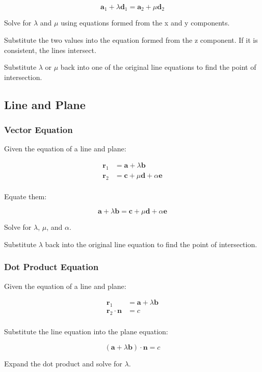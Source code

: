 \documentclass[a4paper,11pt]{report}
\newcommand{\bb}{\boldsymbol}
\begin{document}
$$
\bb{a}_1 + \lambda \bb{d}_1 = \bb{a}_2 + \mu \bb{d}_2
$$

Solve for $\lambda$ and $\mu$ using equations formed from the x and y
components.

Substitute the two values into the equation formed from the z component. If it
is consistent, the lines intersect.

Substitute $\lambda$ or $\mu$ back into one of the original line equations to
find the point of intersection.

\subsection{Line and Plane}

\subsubsection{Vector Equation}

Given the equation of a line and plane:

$$
\begin{aligned}
\bb{r}_1 & = \bb{a} + \lambda \bb{b} \\
\bb{r}_2 & = \bb{c} + \mu \bb{d} + \alpha \bb{e} \\
\end{aligned}
$$

Equate them:

$$
\bb{a} + \lambda \bb{b}  = \bb{c} + \mu \bb{d} + \alpha \bb{e}
$$

Solve for $\lambda$, $\mu$, and $\alpha$.

Substitute $\lambda$ back into the original line equation to find the point of
intersection.

\subsubsection{Dot Product Equation}

Given the equation of a line and plane:

$$
\begin{aligned}
\bb{r}_1 & = \bb{a} + \lambda \bb{b} \\
\bb{r}_2 \cdot \bb{n} & = c \\
\end{aligned}
$$

Substitute the line equation into the plane equation:

$$
(\bb{a} + \lambda \bb{b}) \cdot \bb{n} = c
$$

Expand the dot product and solve for $\lambda$.
\end{document}
